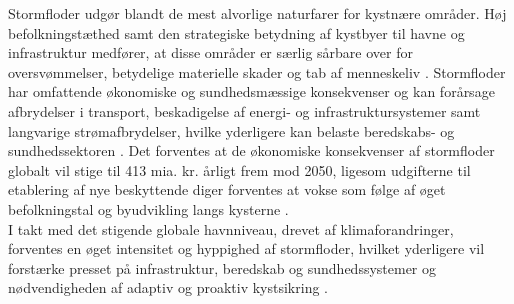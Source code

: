 
Stormfloder udgør blandt de mest alvorlige naturfarer for kystnære områder. Høj befolkningstæthed samt den strategiske betydning af kystbyer til havne og infrastruktur medfører, at disse områder er særlig sårbare over for oversvømmelser, betydelige materielle skader og tab af menneskeliv \citep{kaniewski_solar_2016}. Stormfloder har omfattende økonomiske og sundhedsmæssige konsekvenser og kan forårsage afbrydelser i transport, beskadigelse af energi- og infrastruktursystemer samt langvarige strømafbrydelser, hvilke yderligere kan belaste beredskabs- og sundhedssektoren \citep{lane_health_2013}. Det forventes at de økonomiske konsekvenser af stormfloder globalt vil stige til 413 mia. kr. årligt frem mod 2050, ligesom udgifterne til etablering af nye beskyttende diger forventes at vokse som følge af øget befolkningstal og byudvikling langs kysterne \citep{prahl_damage_2018,hallegatte_future_2013}.\\
I takt med det stigende globale havnniveau, drevet af klimaforandringer, forventes en øget intensitet og hyppighed af stormfloder, hvilket yderligere vil forstærke presset på infrastruktur, beredskab og sundhedssystemer og nødvendigheden af adaptiv og proaktiv kystsikring \citep{marsooli_climate_2019, dedekorkut-howes_when_2020}. \\

